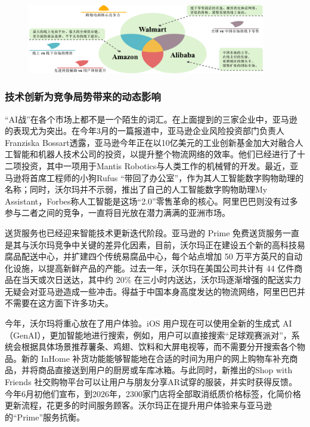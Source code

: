 \documentclass[12pt]{ctexart}
\begin{document}
\begin{figure}[htbp!]
    \centering
    \includegraphics[width=0.93\textwidth]{Images/10.png}
    \label{flow}
\end{figure}

\subsubsection{技术创新为竞争局势带来的动态影响}
“AI战”在各个市场上都不是一个陌生的词汇。在上面提到的三家企业中，亚马逊的表现尤为突出。在今年3月的一篇报道\cite{24}中，亚马逊企业风险投资部门负责人Franziska Bossart透露，亚马逊今年正在以10亿美元的工业创新基金加大对融合人工智能和机器人技术公司的投资，以提升整个物流网络的效率。他们已经进行了十二项投资，其中一项用于Mantis Robotics与人类工作的机械臂的开发。最近，亚马逊将首席工程师的小狗Rufus “带回了办公室”，作为其人工智能数字购物助理的名称；同时，沃尔玛并不示弱，推出了自己的人工智能数字购物助理My Assistant，Forbes称人工智能是这场“2.0”零售革命的核心\cite{25}。阿里巴巴则没有过多参与二者之间的竞争，一直将目光放在潜力满满的亚洲市场。

送货服务也已经迎来智能技术更新迭代阶段。亚马逊的 Prime 免费送货服务一直是其与沃尔玛竞争中关键的差异化因素，目前，沃尔玛正在建设五个新的高科技易腐品配送中心，并扩建四个传统易腐品中心，每个站点增加 50 万平方英尺的自动化设施，以提高新鲜产品的产能。过去一年，沃尔玛在美国公司共计有 44 亿件商品在当天或次日送达，其中约 20\% 在三小时内送达，沃尔玛逐渐增强的配送实力无疑会对亚马逊造成一些冲击\cite{26}。得益于中国本身高度发达的物流网络，阿里巴巴并不需要在这方面下许多功夫。

今年，沃尔玛将重心放在了用户体验。iOS 用户现在可以使用全新的生成式 AI（GenAI），更加智能地进行搜索，例如，用户可以直接搜索“足球观赛派对”，系统会根据具体场景推荐薯条、鸡翅、饮料和大屏电视等，而不需要分开搜索各个物品。新的 InHome 补货功能能够智能地在合适的时间为用户的网上购物车补充商品，并将商品直接送到用户的厨房或车库冰箱。与此同时，新推出的Shop with Friends 社交购物平台可以让用户与朋友分享AR试穿的服装，并实时获得反馈\cite{27}。今年6月初他们宣布，到2026年，2300家门店将全部取消纸质价格标签，化简价格更新流程，花更多的时间服务顾客\cite{28}。沃尔玛正在提升用户体验来与亚马逊的“Prime”服务抗衡。
\end{document}
